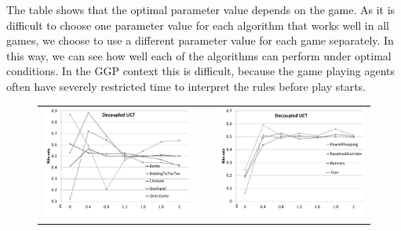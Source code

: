 \documentclass[conference]{IEEEtran}
\begin{document}
The table shows that the optimal parameter value depends on the game. As it is difficult to choose one parameter value 
for each algorithm that works well in all games, we choose to use a different parameter value for each game separately. 
In this way, we can see how well each of the algorithms can perform under optimal conditions. In the GGP context 
this is difficult, because the game playing agents often have severely restricted time to interpret the 
rules before play starts. 

\begin{figure}[t!]
\centering
\begin{tabular}{ccc}
\hspace{-0.8cm}\includegraphics[scale=0.35]{figures/duct1} & ~ & \includegraphics[scale=0.35]{figures/duct2}\\

\end{tabular}
\end{figure}
\end{document}
